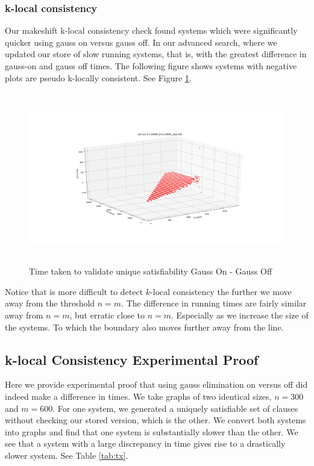 \subsubsection{k-local consistency}
Our makeshift k-local consistency check found systems which were significantly quicker using gauss on versus gauss off. In our advanced search, where we updated our store of slow running systems, that is, with the greatest difference in gauss-on and gauss off times. The following figure shows systems with negative plots are pseudo k-locally consistent. See Figure \ref{fig:kloc}.
\par
\begin{figure}[htbp!] 
	\label{fig:kloc}
	\centering
	\includegraphics[height=75mm]{Figs/diff_3d}
	\caption{Time taken to validate unique satisfiability Gauss On - Gauss Off}
\end{figure}
Notice that is more difficult to detect $k$-local consistency the further we move away from the threshold $n=m$. The difference in running times are fairly similar away from $n=m$, but erratic close to $n=m$. Especially as we increase the size of the systems. To which the boundary also moves further away from the line. 

\subsection{k-local Consistency Experimental Proof}
Here we provide experimental proof that using gauss elimination on versus off did indeed make a difference in times. We take graphs of two identical sizes, $n=300$ and $m=600$. For one system, we generated a uniquely satisfiable set of clauses without checking our stored version, which is the other. We convert both systems into graphs and find that one system is substantially slower than the other. We see that a system with a large  discrepancy in time gives rise to a drastically slower system. See Table \ref{tab:tx}.



